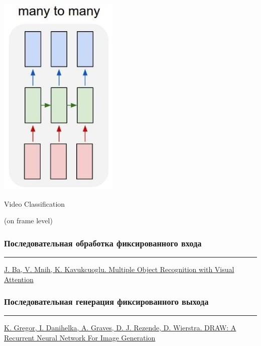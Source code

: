 \documentclass[fullscreen=true, bookmarks=true, hyperref={pdfencoding=unicode}]{beamer}
\begin{document}
\begin{frame}
  \begin{center}
    \includegraphics[keepaspectratio,
                     width=0.3\paperwidth]{many-to-many-2.jpg}

    Video Classification

    (on frame level)
  \end{center}
\end{frame}


\begin{frame}
  \frametitle{Последовательная обработка фиксированного входа}
  \begin{center}
  \end{center}

  \noindent\rule{8cm}{0.4pt}

  \href{https://arxiv.org/abs/1412.7755}{J. Ba, V. Mnih, K. Kavukcuoglu. Multiple Object Recognition with Visual Attention}
\end{frame}

\begin{frame}
  \frametitle{Последовательная генерация фиксированного выхода}
  \begin{center}
  \end{center}

  \noindent\rule{8cm}{0.4pt}

  \href{https://arxiv.org/abs/1502.04623}{K. Gregor, I. Danihelka, A. Graves, D. J. Rezende, D. Wierstra. DRAW: A Recurrent Neural Network For Image Generation}
\end{frame}
\end{document}
